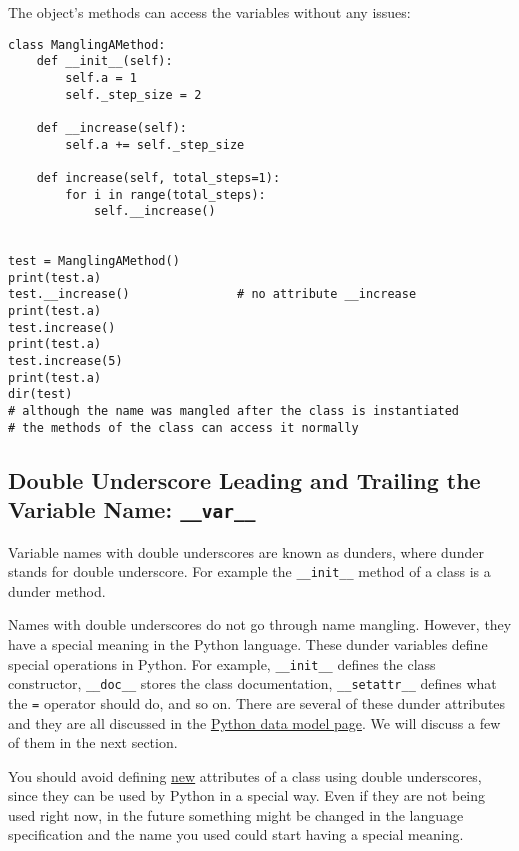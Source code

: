 \documentclass[12pt, a4paper]{article}
\begin{document}
The object's methods can access the variables without any issues:
\lstset{language=jupyter-python,label= ,caption= ,captionpos=b,numbers=none}
\begin{lstlisting}
class ManglingAMethod:
    def __init__(self):
        self.a = 1
        self._step_size = 2

    def __increase(self):
        self.a += self._step_size

    def increase(self, total_steps=1):
        for i in range(total_steps):
            self.__increase()


test = ManglingAMethod()
print(test.a)
test.__increase()               # no attribute __increase
print(test.a)
test.increase()
print(test.a)
test.increase(5)
print(test.a)
dir(test)
# although the name was mangled after the class is instantiated
# the methods of the class can access it normally
\end{lstlisting}
\subsection{Double Underscore Leading and Trailing the Variable Name: \texttt{\_\_var\_\_}}
\label{sec:org74cff39}
Variable names with double underscores are known as dunders, where dunder stands for double underscore.
For example the \texttt{\_\_init\_\_} method of a class is a dunder method.

Names with double underscores do not go through name mangling.
However, they have a special meaning in the Python language.
These dunder variables define special operations in Python.
For example, \texttt{\_\_init\_\_} defines the class constructor, \texttt{\_\_doc\_\_} stores the class documentation, \texttt{\_\_setattr\_\_} defines what the \texttt{=} operator should do, and so on.
There are several of these dunder attributes and they are all discussed in the \href{https://docs.python.org/3/reference/datamodel.html\#basic-customization}{Python data model page}.
We will discuss a few of them in the next section.

You should avoid defining \uline{new} attributes of a class using double underscores, since they can be used by Python in a special way.
Even if they are not being used right now, in the future something might be changed in the language specification and the name you used could start having a special meaning.
\end{document}
